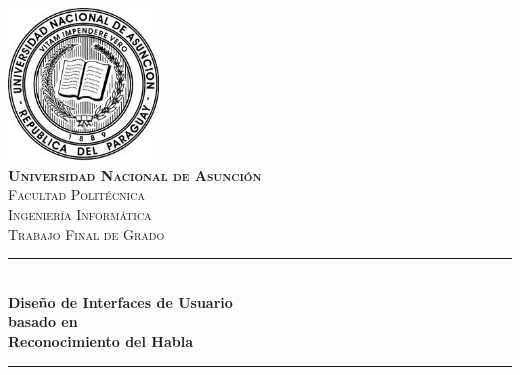 \begin{titlepage}

\newcommand{\HRule}{\rule{\linewidth}{0.5mm}} %

\center %
 

\includegraphics[width=4cm]{./graphics/logo}\\[0.5cm] %



\textbf{\textsc{\LARGE Universidad Nacional de Asunci\'{o}n}}\\[0.5cm] %
\textsc{\LARGE Facultad Polit\'{e}cnica}\\[1.5cm] %
\textsc{\large Ingenier\'{i}a Inform\'{a}tica}\\[0.8cm] %
\textsc{\large Trabajo Final de Grado}\\[0.5cm] %


\HRule \\[0.4cm]
{\huge \bfseries Dise\~{n}o de Interfaces de Usuario\\basado en\\[0.2cm]Reconocimiento del Habla}\\[0.4cm] %
\HRule \\[1.5cm]
 

\end{titlepage}
